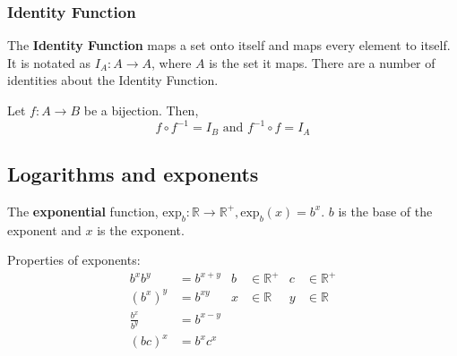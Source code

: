 \subsubsection{Identity Function}

The \textbf{Identity Function} maps a set onto itself and maps every element to itself. It is notated as $I_A: A \rightarrow A$,
where $A$ is the set it maps. There are a number of identities about the Identity Function.

Let $f: A \rightarrow B$ be a bijection. Then,
\[
  f \circ f^{-1} = I_B \text{ and } f^{-1} \circ f = I_A
\]

\subsection{Logarithms and exponents}

The \textbf{exponential} function, $\text{exp}_b: \mathbb{R} \rightarrow \mathbb{R}^+, \text{exp}_b(x) = b^x$.
$b$ is the base of the exponent and $x$ is the exponent.

Properties of exponents:
\begin{align*}
  b^{x}b^{y}      & = b^{x+y} & b & \in \mathbb{R}^+ & c & \in \mathbb{R}^+ \\
  (b^x)^{y}       & = b^{xy}  & x & \in \mathbb{R}   & y & \in \mathbb{R}   \\
  \frac{b^x}{b^y} & = b^{x-y}                                               \\
  (bc)^x          & = b^xc^x
\end{align*}